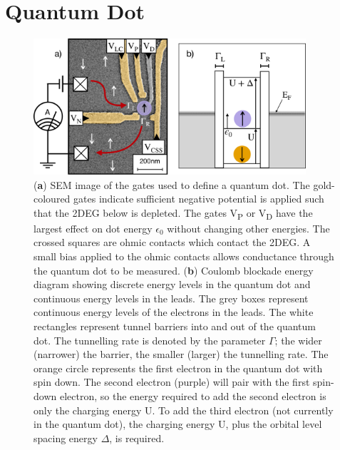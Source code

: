 \afterpage{\clearpage}
\section{Quantum Dot}

\begin{figure}[H]
 \begin{center}
 \includegraphics[width=0.9\textwidth]{figures/ch1/figure4.pdf}
 \caption[Quantum Dot Energy Levels]{\label{fig:ch1/dot_energy_levels} 
 (\textbf{a}) SEM image of the gates used to define a quantum dot. The gold-coloured gates indicate sufficient negative potential is applied such that the 2DEG below is depleted. The gates V\textsubscript{P} or V\textsubscript{D} have the largest effect on dot energy $\epsilon_0$ without changing other energies. The crossed squares are ohmic contacts which contact the 2DEG. A small bias applied to the ohmic contacts allows conductance through the quantum dot to be measured. (\textbf{b}) Coulomb blockade energy diagram showing discrete energy levels in the quantum dot and continuous energy levels in the leads. The grey boxes represent continuous energy levels of the electrons in the leads. The white rectangles represent tunnel barriers into and out of the quantum dot. The tunnelling rate is denoted by the parameter $\Gamma$; the wider (narrower) the barrier, the smaller (larger) the tunnelling rate. The orange circle represents the first electron in the quantum dot with spin down. The second electron (purple) will pair with the first spin-down electron, so the energy required to add the second electron is only the charging energy $\mathrm{U}$. To add the third electron (not currently in the quantum dot), the charging energy $\mathrm{U}$, plus the orbital level spacing energy $\Delta$, is required.}
 \end{center}
\end{figure}


